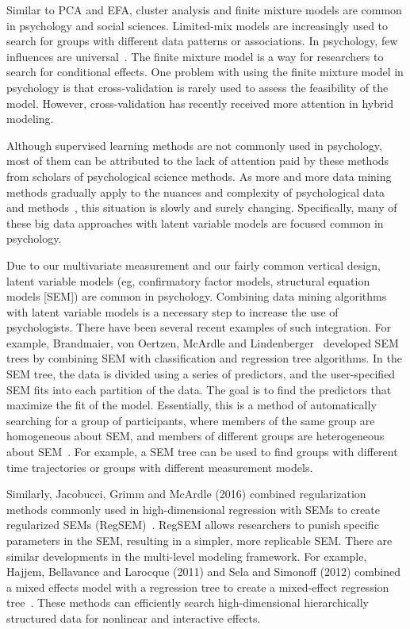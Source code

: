Similar to PCA and EFA, cluster analysis and finite mixture models
 are common in psychology and social sciences. Limited-mix models 
are increasingly used to search for groups with different data 
patterns or associations. In psychology, few influences are 
universal~\cite{editor11}. 
The finite mixture model is a way for researchers to 
search for conditional effects. One problem with using the finite 
mixture model in psychology is that cross-validation is rarely used
 to assess the feasibility of the model. However, cross-validation
 has recently received more attention in hybrid modeling.

Although supervised learning methods are not commonly used in 
psychology, most of them can be attributed to the lack of attention
 paid by these methods from scholars of psychological science 
methods. As more and more data mining methods gradually apply to 
the nuances and complexity of psychological data and 
methods~\cite{editor11}, this situation is 
slowly and surely changing. Specifically, many of these big data 
approaches with latent variable models are focused common in 
psychology.

Due to our multivariate measurement and our fairly common vertical
 design, latent variable models (eg, confirmatory factor models, 
structural equation models [SEM]) are common in psychology. 
Combining data mining algorithms with latent variable models is a 
necessary step to increase the use of psychologists. There have 
been several recent examples of such integration. For example, 
Brandmaier, von Oertzen, McArdle and Lindenberger~\cite{editor11} 
developed SEM trees by combining SEM with classification and 
regression 
tree algorithms. In the SEM tree, the data is divided using a 
series of predictors, and the user-specified SEM fits into each 
partition of the data. The goal is to find the predictors that 
maximize the fit of the model. Essentially, this is a method of 
automatically searching for a group of participants, where members
 of the same group are homogeneous about SEM, and members of 
different groups are heterogeneous about SEM~\cite{editor11}. 
For example, a SEM tree can be used to
 find groups with different time trajectories or groups with 
different measurement models.

Similarly, Jacobucci, Grimm and McArdle (2016) combined 
regularization methods commonly used in high-dimensional regression
 with SEMs to create regularized SEMs (RegSEM)~\cite{editor11}. 
RegSEM allows 
researchers to punish specific parameters in the SEM, resulting in
 a simpler, more replicable SEM. There are similar developments in
 the multi-level modeling framework. For example, Hajjem, 
Bellavance and Larocque (2011) and Sela and Simonoff (2012) 
combined
 a mixed effects model with a regression tree to create a 
mixed-effect regression tree~\cite{editor11}. 
These methods can efficiently search
 high-dimensional hierarchically structured data for nonlinear and
 interactive effects.

